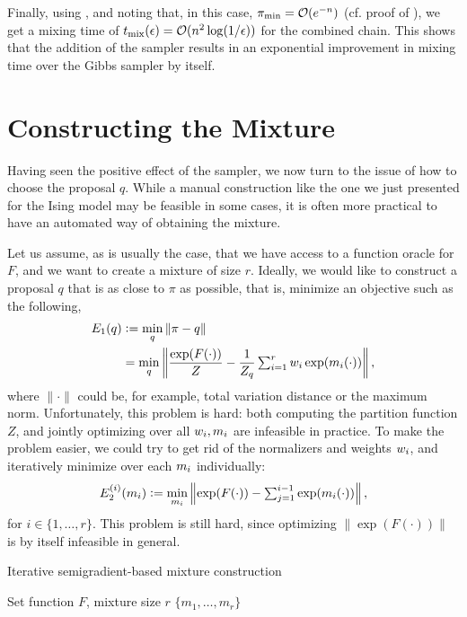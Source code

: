 Finally, using , and noting that, in this case, $\pi_{\textrm{min}} = \mathcal{O}(e^{-n})$ (cf. proof of ), we get a mixing time of $t_{\mathrm{mix}}(\epsilon) = \mathcal{O}(n^2 \log(1 / \epsilon))$ for the combined chain.
This shows that the addition of the \Ms{} sampler results in an exponential improvement in mixing time over the Gibbs sampler by itself.

\section{Constructing the Mixture}
Having seen the positive effect of the \Ms{} sampler, we now turn to the issue of how to choose the proposal $q$.
While a manual construction like the one we just presented for the Ising model may be feasible in some cases, it is often more practical to have an automated way of obtaining the mixture.

Let us assume, as is usually the case, that we have access to a function oracle for $F$, and we want to create a mixture of size $r$.
Ideally, we would like to construct a proposal $q$ that is as close to $\pi$ as possible, that is, minimize an objective such as the following,
\begin{align*}
  E_1(q) &\vcentcolon= \min_q \| \pi - q \|\\
         &= \min_q \left\| \frac{\exp(F(\cdot))}{Z} - \frac{1}{Z_q}\textstyle\sum_{i = 1}^r w_i\exp(m_i(\cdot)) \right\|,
\end{align*}
where $\| \cdot \|$ could be, for example, total variation distance or the maximum norm.
Unfortunately, this problem is hard: both computing the partition function $Z$, and jointly optimizing over all $w_i, m_i$ are infeasible in practice.
To make the problem easier, we could try to get rid of the normalizers and weights $w_i$, and iteratively minimize over each $m_i$ individually:
\begin{align*}
  E_2^{(i)}(m_i) \vcentcolon= \min_{m_i} \left\| \exp(F(\cdot)) - \textstyle\sum_{j = 1}^{i-1} \exp(m_i(\cdot)) \right\|,
\end{align*}
for $i \in \{1, \ldots, r\}$.
This problem is still hard, since optimizing $\| \exp(F(\cdot)) \|$ is by itself infeasible in general.

\begin{algorithm}[tb]
  \caption{Iterative semigradient-based mixture construction}
  \label{alg:mixture}
  \small{
    \begin{algorithmic}[1]
      \REQUIRE Set function $F$, mixture size $r$
       \label{lin:perm}
      \ENDFOR
      \RETURN $\{m_1, \ldots, m_r\}$
    \end{algorithmic}
  }
\end{algorithm}

